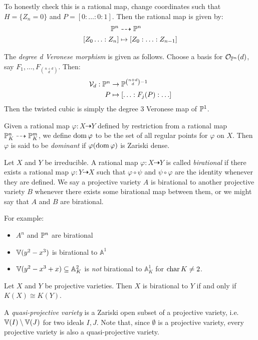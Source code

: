 \documentclass[10pt,a4paper,rgb]{article}
\newcommand{\A}{\mathbb{A}}
\begin{document}
To honestly check this is a rational map, change coordinates such that $H = \{Z_n = 0\}$ and $P = [0:\ldots:0:1]$. Then the rational map is given by:
\begin{align*}
\P^n &\dashrightarrow \P^n\\
[Z_0\ldots:Z_n] &\mapsto [Z_0:\ldots:Z_{n-1}]
\end{align*}

The \emph{degree d Veronese morphism} is given as follows. Choose a basis for $\mathcal{O}_{\P^n}(d)$, say $F_1, \ldots, F_{\binom{n+d}{d}}$. Then:
\begin{align*}
\mathcal{V}_d:\P^n &\to \P^{\binom{n+d}{d}-1}\\
P &\mapsto [\ldots : F_j(P):\ldots]
\end{align*}
Then the twisted cubic is simply the degree 3 Veronese map of $\P^1$.

Given a rational map $\varphi:X \dashrightarrow Y$ defined by restriction from a rational map $\P^n_K \dashrightarrow \P^m_K$, we define $\Dom \varphi$ to be the  set of all regular points for $\varphi$ on $X$. Then $\varphi$ is said to be \emph{dominant} if $\varphi(\Dom \varphi)$ is Zariski dense.

Let $X$ and $Y$ be irreducible. A rational map $\varphi : X \dashrightarrow Y$ is called \emph{birational} if there exists a rational map $\varphi: Y \dashrightarrow X$ such that $\varphi \circ \psi$ and $\psi \circ \varphi$ are the identity whenever they are defined. We say a projective variety $A$ is birational to another projective variety $B$ whenever there exists some birational map between them, or we might say that $A$ and $B$ are birational.

For example:
\begin{itemize}
\item $A^n$ and $\P^n$ are birational
\item $\V(y^2-x^3)$ is birational to $\A^1$
\item $\V(y^2-x^3+x) \subseteq \A^2_K$ is \textit{not} birational to $\A_K^1$ for $\charr K \neq 2$.
\end{itemize}
\begin{theorem}
Let $X$ and $Y$ be projective varieties. Then $X$ is birational to $Y$ if and only if $K(X) \cong K(Y)$.
\end{theorem}

A \emph{quasi-projective variety} is a Zariski open subset of a projective variety, i.e. $\V(I) \setminus \V(J)$ for two ideals $I, J$. Note that, since $\emptyset$ is a projective variety, every projective variety is also a quasi-projective variety.
\end{document}
